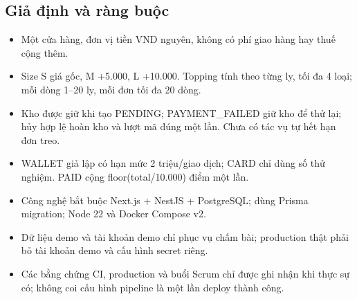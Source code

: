 \documentclass[a4paper,12pt,oneside]{report}
\begin{document}
\subsection{Giả định và ràng buộc}
\begin{itemize}
\item Một cửa hàng, đơn vị tiền VND nguyên, không có phí giao hàng hay thuế cộng thêm.
\item Size S giá gốc, M +5.000, L +10.000. Topping tính theo từng ly, tối đa 4 loại; mỗi dòng 1–20 ly, mỗi đơn tối đa 20 dòng.
\item Kho được giữ khi tạo PENDING; PAYMENT\_FAILED giữ kho để thử lại; hủy hợp lệ hoàn kho và lượt mã đúng một lần. Chưa có tác vụ tự hết hạn đơn treo.
\item WALLET giả lập có hạn mức 2 triệu/\allowbreak{}giao dịch; CARD chỉ dùng số thử nghiệm. PAID cộng floor(total/\allowbreak{}10.000) điểm một lần.
\item Công nghệ bắt buộc Next.js + NestJS + PostgreSQL; dùng Prisma migration; Node 22 và Docker Compose v2.
\item Dữ liệu demo và tài khoản demo chỉ phục vụ chấm bài; production thật phải bỏ tài khoản demo và cấu hình secret riêng.
\item Các bằng chứng CI, production và buổi Scrum chỉ được ghi nhận khi thực sự có; không coi cấu hình pipeline là một lần deploy thành công.
\end{itemize}
\end{document}
